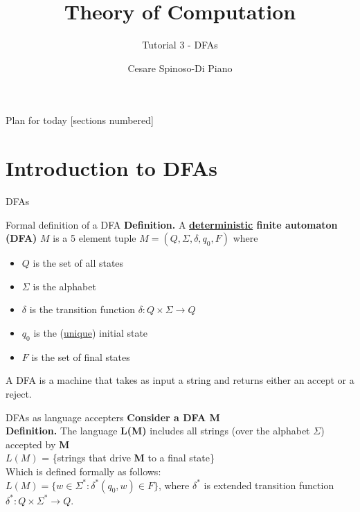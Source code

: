 \documentclass[10pt]{beamer}
\title{Theory of Computation}
\subtitle{Tutorial 3 - DFAs}
\author{Cesare Spinoso-Di Piano}
\date{}
\begin{document}
\maketitle

\begin{frame}{Plan for today}
    [sections numbered]
    \tableofcontents[hideallsubsections]
\end{frame}

\section{Introduction to DFAs}

\begin{frame}{DFAs}

\end{frame}


\begin{frame}[t]{Formal definition of a DFA}
    \textbf{Definition.} A \textbf{\underline{deterministic} finite automaton (DFA)} $M$ is a 5 element tuple $M = (Q, \Sigma, \delta, q_0, F)$ where
    \begin{itemize}
        \item $Q$ is the set of all states
        \item $\Sigma$ is the alphabet
        \item $\delta$ is the transition function $\delta: Q \times \Sigma \rightarrow Q$
        \item $q_0$ is the (\underline{unique}) initial state
        \item $F$ is the set of final states
    \end{itemize}
    A DFA is a machine that takes as input a string and returns either an accept or a reject.
\end{frame}


\begin{frame}{DFAs as language accepters}
    \textbf{Consider a DFA M}\\
    \textbf{Definition.} The language \textbf{L(M)} includes all strings (over the alphabet $\Sigma$) accepted by \textbf{M}\\
    {$L(M)$} = \{strings that drive \textbf{M} to a final state\}\\\bigskip
    Which is defined formally as follows:\\
    $L(M) = \{w\in \Sigma ^*: \delta ^*(q_0,w)\in F\}$, where $\delta ^*$ is extended transition function $\delta ^*: Q\times \Sigma ^*\rightarrow Q$.
\end{frame}
\end{document}
